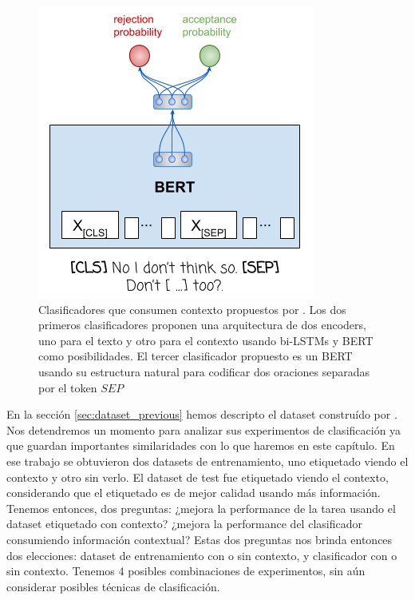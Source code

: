 \begin{figure}[t]
    \begin{minipage}[b]{0.35\textwidth}
        \includegraphics[width=\textwidth]{img/pavlopoulos_bert_sep_classifier.png}
    \end{minipage}


    \caption{Clasificadores que consumen contexto propuestos por \citet{pavlopoulos2020toxicity}. Los dos primeros clasificadores proponen una arquitectura de dos encoders, uno para el texto y otro para el contexto usando bi-LSTMs y BERT como posibilidades. El tercer clasificador propuesto es un BERT usando su estructura natural para codificar dos oraciones separadas por el token $SEP$ }
    \label{fig:pavlopoulos_classifiers}
\end{figure}


En la sección \ref{sec:dataset_previous} hemos descripto el dataset construído por \citet{pavlopoulos2020toxicity}. Nos detendremos un momento para analizar sus experimentos de clasificación  ya que guardan importantes similaridades con lo que haremos en este capítulo. En ese trabajo se obtuvieron dos datasets de entrenamiento, uno etiquetado viendo el contexto y otro sin verlo. El dataset de test fue etiquetado viendo el contexto, considerando que el etiquetado es de mejor calidad usando más información. Tenemos entonces, dos preguntas: ¿mejora la performance de la tarea usando el dataset etiquetado con contexto? ¿mejora la performance del clasificador consumiendo información contextual? Estas dos preguntas nos brinda entonces dos elecciones: dataset de entrenamiento con o sin contexto, y clasificador con o sin contexto. Tenemos 4 posibles combinaciones de experimentos, sin aún considerar posibles técnicas de clasificación.

